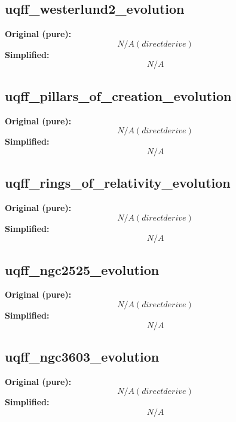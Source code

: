 \subsection{uqff_westerlund2_evolution}
\textbf{Original (pure):}
\begin{equation}
N/A (direct derive)
\end{equation}
\textbf{Simplified:}
\begin{equation}
N/A
\end{equation}

\subsection{uqff_pillars_of_creation_evolution}
\textbf{Original (pure):}
\begin{equation}
N/A (direct derive)
\end{equation}
\textbf{Simplified:}
\begin{equation}
N/A
\end{equation}

\subsection{uqff_rings_of_relativity_evolution}
\textbf{Original (pure):}
\begin{equation}
N/A (direct derive)
\end{equation}
\textbf{Simplified:}
\begin{equation}
N/A
\end{equation}

\subsection{uqff_ngc2525_evolution}
\textbf{Original (pure):}
\begin{equation}
N/A (direct derive)
\end{equation}
\textbf{Simplified:}
\begin{equation}
N/A
\end{equation}

\subsection{uqff_ngc3603_evolution}
\textbf{Original (pure):}
\begin{equation}
N/A (direct derive)
\end{equation}
\textbf{Simplified:}
\begin{equation}
N/A
\end{equation}

